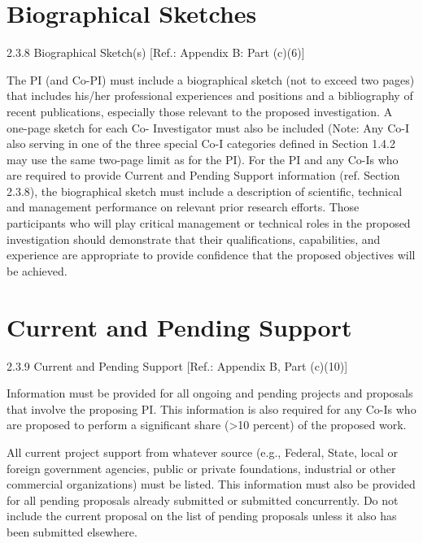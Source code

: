 \documentclass[12pt]{article}
\begin{document}
\cleardoublepage

\section*{Biographical Sketches}
%
2.3.8 Biographical Sketch(s) [Ref.: Appendix B: Part (c)(6)]

The PI (and Co-PI) must include a biographical sketch (not to exceed
two pages) that includes his/her professional experiences and
positions and a bibliography of recent publications, especially those
relevant to the proposed investigation. A one-page sketch for each Co-
Investigator must also be included (Note: Any Co-I also serving in one
of the three special Co-I categories defined in Section 1.4.2 may use
the same two-page limit as for the PI). For the PI and any Co-Is who
are required to provide Current and Pending Support information
(ref. Section 2.3.8), the biographical sketch must include a
description of scientific, technical and management performance on
relevant prior research efforts. Those participants who will play
critical management or technical roles in the proposed investigation
should demonstrate that their qualifications, capabilities, and
experience are appropriate to provide confidence that the proposed
objectives will be achieved.

\cleardoublepage




\cleardoublepage

\section*{Current and Pending Support}
2.3.9 Current and Pending Support [Ref.: Appendix B, Part (c)(10)]

Information must be provided for all ongoing and pending projects and
proposals that involve the proposing PI. This information is also
required for any Co-Is who are proposed to perform a significant share
(>10 percent) of the proposed work.

All current project support from whatever source (e.g., Federal,
State, local or foreign government agencies, public or private
foundations, industrial or other commercial organizations) must be
listed. This information must also be provided for all pending
proposals already submitted or submitted concurrently. Do not include
the current proposal on the list of pending proposals unless it also
has been submitted elsewhere.
\end{document}
